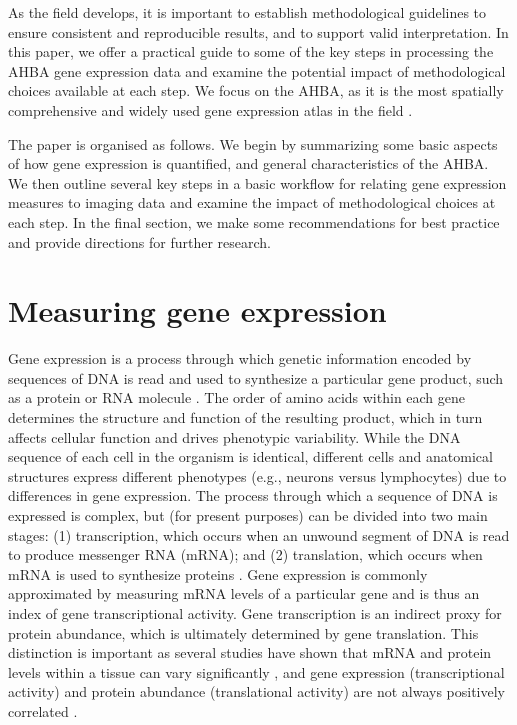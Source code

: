 As the field develops, it is important to establish methodological guidelines to ensure consistent and reproducible results, and to support valid interpretation. In this paper, we offer a practical guide to some of the key steps in processing the AHBA gene expression data and examine the potential impact of methodological choices available at each step. We focus on the AHBA, as it is the most spatially comprehensive and widely used gene expression atlas in the field \citep{Hawrylycz2012}.

The paper is organised as follows. We begin by summarizing some basic aspects of how gene expression is quantified, and general characteristics of the AHBA. We then outline several key steps in a basic workflow for relating gene expression measures to imaging data and examine the impact of methodological choices at each step. In the final section, we make some recommendations for best practice and provide directions for further research.


\section{Measuring gene expression}

Gene expression is a process through which genetic information encoded by sequences of DNA is read and used to synthesize a particular gene product, such as a protein or RNA molecule \citep{Szymanski2002}. The order of amino acids within each gene determines the structure and function of the resulting product, which in turn affects cellular function and drives phenotypic variability. While the DNA sequence of each cell in the organism is identical, different cells and anatomical structures express different phenotypes (e.g., neurons versus lymphocytes) due to differences in gene expression. The process through which a sequence of DNA is expressed is complex, but (for present purposes) can be divided into two main stages: (1) transcription, which occurs when an unwound segment of DNA is read to produce messenger RNA (mRNA); and (2) translation, which occurs when mRNA is used to synthesize proteins \citep{Krebs2014}. Gene expression is commonly approximated by measuring mRNA levels of a particular gene and is thus an index of gene transcriptional activity. Gene transcription is an indirect proxy for protein abundance, which is ultimately determined by gene translation. This distinction is important as several studies have shown that mRNA and protein levels within a tissue can vary significantly \citep{Futcher1999,Gygi1999,Greenbaum2003}, and gene expression (transcriptional activity) and protein abundance (translational activity) are not always positively correlated \citep{Margineantu2007,Schwanhausser2011}.

